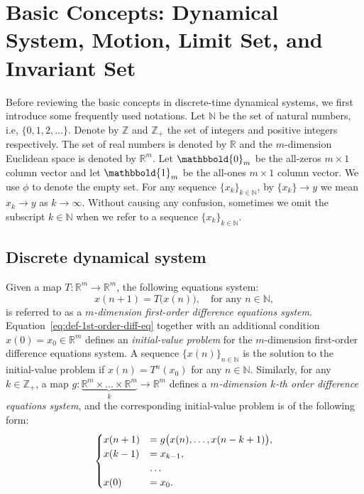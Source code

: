 \documentclass[10pt]{svmult}
\newcommand{\vect}[1]{\mathbbold{#1}}
\begin{document}
\vspace{1cm}
\section{Basic Concepts: Dynamical System, Motion, Limit Set, and Invariant Set}

Before reviewing the basic concepts in discrete-time dynamical systems, we first introduce some frequently used notations. Let $\mathbb{N}$ be the set of natural numbers, i.e, $\{0,1,2,\dots\}$. Denote by $\mathbb{Z}$ and $\mathbb{Z}_+$ the set of integers and positive integers respectively. The set of real numbers is denoted by $\mathbb{R}$ and the $m$-dimension Euclidean space is denoted by $\mathbb{R}^m$. Let $\vect{0}_m$ be the all-zeros $m\times 1$ column vector and let $\vect{1}_m$ be the all-ones $m\times 1$ column vector. We use $\phi$ to denote the empty set. For any sequence $\{x_k\}_{k\in \mathbb{N}}$, by $\{x_k\}\to y$ we mean $x_k \to y$ as $k\to \infty$. Without causing any confusion, sometimes we omit the subscript $k\in \mathbb{N}$ when we refer to a sequence $\{x_k\}_{k\in \mathbb{N}}$. 

\subsection{Discrete dynamical system}

Given a map $T:\mathbb{R}^m \to \mathbb{R}^m$, the following equations system:
\begin{equation}\label{eq:def-1st-order-diff-eq}
x(n+1)=T\big( x(n) \big), \quad \text{for any }n\in \mathbb{N},
\end{equation}
is referred to as a \emph{$m$-dimension first-order difference equations system}. Equation~\eqref{eq:def-1st-order-diff-eq} together with an additional condition $x(0)=x_0\in \mathbb{R}^m$ defines an \emph{initial-value problem} for the $m$-dimension first-order difference equations system. A sequence $\{x(n)\}_{n\in \mathbb{N}}$ is the solution to the initial-value problem if $x(n)=T^n(x_0)$ for any $n\in \mathbb{N}$. Similarly, for any $k\in \mathbb{Z}_+$, a map $g:\underbrace{\mathbb{R}^m\times \dots \times \mathbb{R}^m }\limits_{k} \to \mathbb{R}^m$ defines a \emph{$m$-dimension $k$-th order difference equations system}, and the corresponding initial-value problem is of the following form:
\begin{equation*}
\begin{cases}
\displaystyle x(n+1) & = g\big( x(n),\dots,x(n-k+1) \big),\\
\displaystyle x(k-1) & = x_{k-1},\\
\displaystyle & \dots  \\
\displaystyle x(0) & = x_0.
\end{cases}
\end{equation*} 
\end{document}
